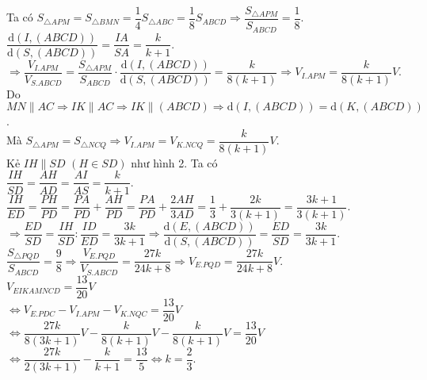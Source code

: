 \begin{ex}
{		Ta có $S_{\triangle APM}=S_{\triangle BMN}=\dfrac{1}{4} S_{\triangle ABC}=\dfrac{1}{8} S_{ABCD} \Rightarrow \dfrac{S_{\triangle APM}}{S_{ABCD}}=\dfrac{1}{8}$.\\
		$\dfrac{\mathrm{d}(I,(ABCD))}{\mathrm{d}(S,(ABCD))}=\dfrac{IA}{SA}=\dfrac{k}{k+1}$.\\
		$\Rightarrow \dfrac{V_{I.APM}}{V_{S.ABCD}}=\dfrac{S_{\triangle APM}}{S_{ABCD}} \cdot \dfrac{\mathrm{d}(I,(ABCD))}{\mathrm{d}(S,(ABCD))}=\dfrac{k}{8(k+1)} \Rightarrow V_{I.APM}=\dfrac{k}{8(k+1)} V$.\\
		Do $MN \parallel AC \Rightarrow IK \parallel AC \Rightarrow IK \parallel(ABCD) \Rightarrow \mathrm{d}(I,(ABCD))=\mathrm{d}(K,(ABCD))$.\\
		Mà $S_{\triangle APM}=S_{\triangle NCQ} \Rightarrow V_{I.APM}=V_{K.NCQ}=\dfrac{k}{8(k+1)} V$.\\
		Kẻ $IH \parallel SD$ $(H \in SD)$ như hình 2. Ta có\\
		$\dfrac{IH}{SD}=\dfrac{AH}{AD}=\dfrac{AI}{AS}=\dfrac{k}{k+1}$.\\
		$\dfrac{IH}{ED}=\dfrac{PH}{PD}=\dfrac{PA}{PD}+\dfrac{AH}{PD}=\dfrac{PA}{PD}+\dfrac{2 AH}{3 AD}=\dfrac{1}{3}+\dfrac{2 k}{3(k+1)}=\dfrac{3 k+1}{3(k+1)}$.\\
		$\Rightarrow \dfrac{ED}{SD}=\dfrac{IH}{SD}\colon \dfrac{ID}{ED}=\dfrac{3 k}{3 k+1} \Rightarrow \dfrac{\mathrm{d}(E,(ABCD))}{\mathrm{d}(S,(ABCD))}=\dfrac{ED}{SD}=\dfrac{3 k}{3 k+1}$.\\
		$\dfrac{S_{\triangle PQD}}{S_{ABCD}}=\dfrac{9}{8} \Rightarrow \dfrac{V_{E.PQD}}{V_{S.ABCD}}=\dfrac{27 k}{24 k+8} \Rightarrow V_{E.PQD}=\dfrac{27 k}{24 k+8} V$.\\
		$V_{EIKAMNCD}=\dfrac{13}{20} V$\\
		$\Leftrightarrow V_{E.PDC}-V_{I.APM}-V_{K.NQC}=\dfrac{13}{20} V$\\
		$\Leftrightarrow \dfrac{27 k}{8(3 k+1)} V-\dfrac{k}{8(k+1)} V-\dfrac{k}{8(k+1)} V=\dfrac{13}{20} V$\\
		$\Leftrightarrow \dfrac{27 k}{2(3 k+1)}-\dfrac{k}{k+1}=\dfrac{13}{5} \Leftrightarrow k=\dfrac{2}{3}$.}
\end{ex}

